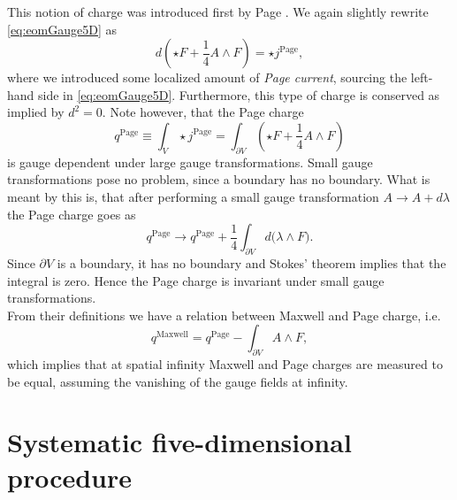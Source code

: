 \documentclass[12pt,twoside]{book}
\begin{document}
 This notion of charge was introduced first by Page \cite{Page:1983pc}. We again slightly rewrite \eqref{eq:eomGauge5D} as
\begin{equation}
d ( \star F + \frac{1}{4} A \wedge F ) = \star j^{\mathrm{Page}},
\end{equation}
where we introduced some localized amount of \emph{Page current}, sourcing the left-hand side in \eqref{eq:eomGauge5D}. Furthermore, this type of charge is conserved as implied by $d^{2} = 0$. Note however, that the Page charge
\begin{equation}\label{def:PageCharge}
q^{\mathrm{Page}} \equiv \int_{V} \star j^{\mathrm{Page}} = \int_{\partial V} (\star F + \frac{1}{4} A \wedge F)
\end{equation}
is gauge dependent under large gauge transformations. Small gauge transformations pose no problem, since a boundary has no boundary. What is meant by this is, that after performing a small gauge transformation $A \rightarrow A + d\lambda$ the Page charge goes as
\begin{equation}
q^{\mathrm{Page}} \rightarrow q^{\mathrm{Page}} + \frac{1}{4} \int_{\partial V} d\big( \lambda \wedge F \big).
\end{equation}
Since $\partial V$ is a boundary, it has no boundary and Stokes' theorem implies that the integral is zero. Hence the Page charge is invariant under small gauge transformations.\\

From their definitions we have a relation between Maxwell and Page charge, i.e.\
\begin{equation}
q^{\mathrm{Maxwell}} = q^{\mathrm{Page}} - \int_{\partial V} A \wedge F,
\end{equation}
which implies that at spatial infinity Maxwell and Page charges are measured to be equal, assuming the vanishing of the gauge fields at infinity.
 
\section{Systematic five-dimensional procedure}
\end{document}

